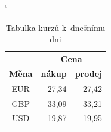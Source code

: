 \documentclass[11pt,a4paper]{article}
\begin{document}
\bigskip
\begin{table}[h]
\begin{center}

\catcode` %
\begin{tabular}{|c|r|r|} \hline
    & \multicolumn{2}{|c|}{\textbf{Cena}}\\\cline{2-3}
    \textbf{Měna} & \textbf{nákup} & \textbf{prodej}\\ \hline
    EUR & 27,34 & 27,42\\
    GBP & 33,09 & 33,21\\
    USD & 19,87 & 19,95\\ \hline
   
\end{tabular}

\caption{Tabulka kurzů k~dnešnímu dni}
 \label{tab1}
\end{center}
\end{table}


\bigskip
\end{document}
